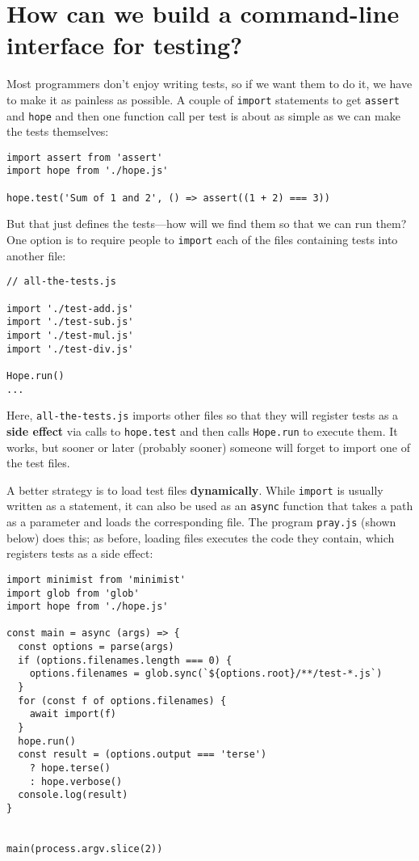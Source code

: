 \documentclass[krantzl]{krantz}
\newcommand{\glossref}[1]{\textbf{#1}}
\begin{document}
\section{How can we build a command-line interface for testing?}\label{unit-test-cli}


Most programmers don’t enjoy writing tests,
so if we want them to do it,
we have to make it as painless as possible.
A couple of \texttt{import} statements to get \texttt{assert} and \texttt{hope}
and then one function call per test
is about as simple as we can make the tests themselves:


\begin{lstlisting}[frame=tblr]
import assert from 'assert'
import hope from './hope.js'

hope.test('Sum of 1 and 2', () => assert((1 + 2) === 3))
\end{lstlisting}



But that just defines the tests—how will we find them so that we can run them?
One option is to require people to \texttt{import} each of the files containing tests
into another file:

\begin{lstlisting}[frame=tblr]
// all-the-tests.js

import './test-add.js'
import './test-sub.js'
import './test-mul.js'
import './test-div.js'

Hope.run()
...
\end{lstlisting}


\noindent Here,
\texttt{all-the-tests.js} imports other files so that they will register tests
as a \glossref{side effect} via calls to \texttt{hope.test}
and then calls \texttt{Hope.run} to execute them.
It works,
but sooner or later (probably sooner) someone will forget to import one of the test files.


A better strategy is to load test files \glossref{dynamically}.
While \texttt{import} is usually written as a statement,
it can also be used as an \texttt{async} function
that takes a path as a parameter and loads the corresponding file.
The program \texttt{pray.js} (shown below) does this;
as before,
loading files executes the code they contain,
which registers tests as a side effect:


\begin{lstlisting}[frame=tblr]
import minimist from 'minimist'
import glob from 'glob'
import hope from './hope.js'

const main = async (args) => {
  const options = parse(args)
  if (options.filenames.length === 0) {
    options.filenames = glob.sync(`${options.root}/**/test-*.js`)
  }
  for (const f of options.filenames) {
    await import(f)
  }
  hope.run()
  const result = (options.output === 'terse')
    ? hope.terse()
    : hope.verbose()
  console.log(result)
}


main(process.argv.slice(2))
\end{lstlisting}
\end{document}
